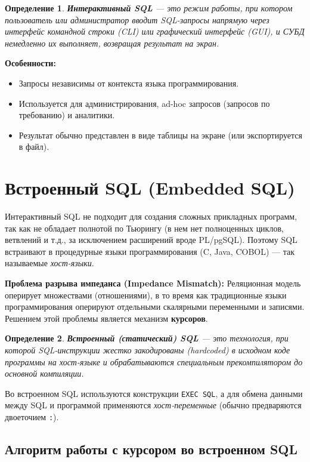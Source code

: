 \documentclass[12pt, a4paper]{article}
\newtheorem{definition}{Определение}
\begin{document}
\begin{definition}
\textbf{Интерактивный SQL} — это режим работы, при котором пользователь или администратор вводит SQL-запросы напрямую через интерфейс командной строки (CLI) или графический интерфейс (GUI), и СУБД немедленно их выполняет, возвращая результат на экран.
\end{definition}

\textbf{Особенности:}
\begin{itemize}
    \item Запросы независимы от контекста языка программирования.
    \item Используется для администрирования, ad-hoc запросов (запросов по требованию) и аналитики.
    \item Результат обычно представлен в виде таблицы на экране (или экспортируется в файл).
\end{itemize}

\section{Встроенный SQL (Embedded SQL)}

Интерактивный SQL не подходит для создания сложных прикладных программ, так как не обладает полнотой по Тьюрингу (в нем нет полноценных циклов, ветвлений и т.д., за исключением расширений вроде PL/pgSQL). Поэтому SQL встраивают в процедурные языки программирования (C, Java, COBOL) — так называемые \textit{хост-языки}.

\textbf{Проблема разрыва импеданса (Impedance Mismatch):}
Реляционная модель оперирует множествами (отношениями), в то время как традиционные языки программирования оперируют отдельными скалярными переменными и записями. Решением этой проблемы является механизм \textbf{курсоров}.

\begin{definition}
\textbf{Встроенный (статический) SQL} — это технология, при которой SQL-инструкции жестко закодированы (hardcoded) в исходном коде программы на хост-языке и обрабатываются специальным прекомпилятором до основной компиляции.
\end{definition}

Во встроенном SQL используются конструкции \texttt{EXEC SQL}, а для обмена данными между SQL и программой применяются \textit{хост-переменные} (обычно предваряются двоеточием \texttt{:}).

\subsection{Алгоритм работы с курсором во встроенном SQL}
\end{document}
